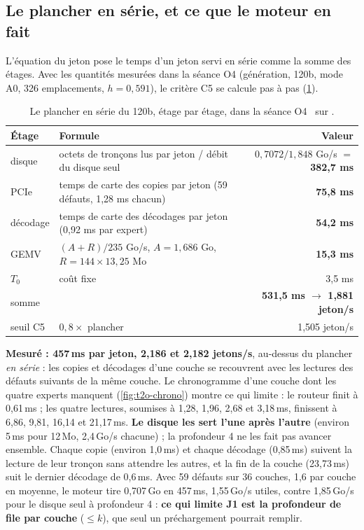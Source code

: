 \subsection{Le plancher en série, et ce que le moteur en fait}

L'équation du jeton pose le temps d'un jeton servi en série comme la somme des étages. Avec les quantités mesurées dans la séance O4 (génération, 120b, mode A0, 326 emplacements, $h = 0{,}591$), le critère C5 se calcule pas à pas (\cref{tab:t2o-c5}).

\begin{table}[ht]
\centering\small
\caption[Le plancher en série du 120b]{Le plancher en série du 120b, étage par étage, dans la séance O4 \calc~sur \mes.}
\label{tab:t2o-c5}
\begin{tabular}{@{}llr@{}}
\toprule
Étage & Formule & Valeur \\
\midrule
disque & octets de tronçons lus par jeton / débit du disque seul & $0{,}7072 / 1{,}848$ Go/s $=$ \textbf{382,7 ms} \\
PCIe & temps de carte des copies par jeton (59 défauts, 1,28 ms chacun) & \textbf{75,8 ms} \\
décodage & temps de carte des décodages par jeton (0,92 ms par expert) & \textbf{54,2 ms} \\
GEMV & $(A + R)/235$ Go/s, $A = 1{,}686$ Go, $R = 144 \times 13{,}25$ Mo & \textbf{15,3 ms} \\
$T_0$ & coût fixe & 3,5 ms \\
\midrule
somme & & \textbf{531,5 ms $\to$ 1,881 jeton/s} \\
seuil C5 & $0{,}8 \times$ plancher & 1,505 jeton/s \\
\bottomrule
\end{tabular}
\end{table}

\textbf{Mesuré : 457\,ms par jeton, 2,186 et 2,182 jetons/s}, au-dessus du plancher \emph{en série} : les copies et décodages d'une couche se recouvrent avec les lectures des défauts suivants de la même couche. Le chronogramme d'une couche dont les quatre experts manquent (\cref{fig:t2o-chrono}) montre ce qui limite : le routeur finit à 0,61\,ms ; les quatre lectures, soumises à 1,28, 1,96, 2,68 et 3,18\,ms, finissent à 6,86, 9,81, 16,14 et 21,17\,ms. \textbf{Le disque les sert l'une après l'autre} (environ 5\,ms pour 12\,Mo, 2,4\,Go/s chacune) ; la profondeur 4 ne les fait pas avancer ensemble. Chaque copie (environ 1,0\,ms) et chaque décodage (0,85\,ms) suivent la lecture de leur tronçon sans attendre les autres, et la fin de la couche (23,73\,ms) suit le dernier décodage de 0,6\,ms. Avec 59 défauts sur 36 couches, 1,6 par couche en moyenne, le moteur tire 0,707\,Go en 457\,ms, 1,55\,Go/s utiles, contre 1,85\,Go/s pour le disque seul à profondeur 4 : \textbf{ce qui limite J1 est la profondeur de file par couche} ($\le k$), que seul un préchargement pourrait remplir.

